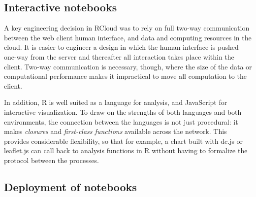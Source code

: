 

\subsection{Interactive notebooks\label{sec:interactivenotebooks}}




A key engineering decision in RCloud was to rely on full two-way
communication between the web client human interface, and data and
computing resources in the cloud. It is easier to engineer a design
in which the human interface is pushed one-way from the server
and thereafter all interaction takes place within the client.
Two-way communication is necessary, though, where the size of
the data or computational performance makes it impractical to
move all computation to the client.

In addition, R is well suited as a language for analysis, and
JavaScript for interactive visualization. To draw on
the strengths of both languages and both environments, the connection
between the languages is not just procedural: it makes \emph{closures}
and \emph{first-class functions} available across the network.
This provides considerable flexibility, so that for example, a chart built
with dc.js or leaflet.js can call back to analysis functions in R
without having to formalize the protocol between the processes.

\subsection{Deployment of notebooks\label{sec:deployment}}

